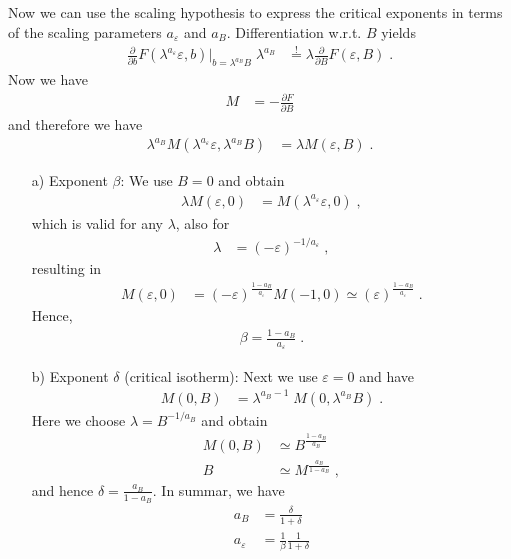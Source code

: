 Now we can use the scaling hypothesis to express the critical exponents
in terms of the scaling parameters $a_{\varepsilon}$ and $a_{B}$.
Differentiation w.r.t. $B$ yields
%
\begin{align*}
 \frac{\partial }{\partial b}
 F(\lambda^{a_{\varepsilon}}\varepsilon,b) \bigg|_{b= \lambda^{a_{B}}B}
\; \lambda^{a_{B}}
&\overset{!}{=} \lambda
\frac{\partial }{\partial B}
F(\varepsilon,B)\;.
\end{align*}
%
Now we have 
%
\begin{align*}
M &= -\frac{\partial F}{\partial B}
\end{align*}
%
and therefore  we have
%
\begin{align}
\lambda^{a_{B}} 
M(\lambda^{a_{\varepsilon}}\varepsilon,\lambda^{a_{B}}B) 
&= \lambda M(\varepsilon,B)\;.
\end{align}
%
\begin{enumerate}
	\item[a)] {\color{blue}Exponent $\beta$:} We use $B=0$ and obtain
%
\begin{align*}
\lambda M(\varepsilon,0) &=M(\lambda^{a_{\varepsilon}}\varepsilon,0) \;,
\end{align*}
%
which is valid for any $\lambda$, also for 
%
\begin{align*}
\lambda&=(-\varepsilon)^{-1/a_{\varepsilon}}\;,
\end{align*}
%
resulting in 
%
\begin{align*}
M(\varepsilon,0) &= (-\varepsilon)^{\frac{1-a_{B}}{a_{\varepsilon}}} M(-1,0)\simeq (\varepsilon)^{\frac{1-a_{B}}{a_{\varepsilon}}} \;.
\end{align*}
%
Hence, 
%
\begin{align*}
\beta=\frac{1-a_{B}}{a_{\varepsilon}} \;.
\end{align*}
%
\item[b)] {\color{blue}Exponent $\delta$ (critical isotherm):}
Next we use $\varepsilon=0$ and have
%
\begin{align*}
M(0,B) &= \lambda^{a_{B}-1}\;M(0,\lambda^{a_{B}}B)\;.
\end{align*}
%
Here we choose $\lambda =B^{-1/a_{B}}$ and obtain
%
\begin{align*}
M(0,B) &\simeq  B^{\frac{1-a_{B}}{a_{B}}}\\
B &\simeq M^{\frac{a_{B}}{1-a_{B}}}\;,
\end{align*}
%
and hence $\delta=\frac{a_{B}}{1-a_{B}}$.
In summar, we have
%
\begin{align}\label{eq:}
a_{B} &= \frac{\delta}{1+\delta}\\
a_{\varepsilon} &= \frac{1}{\beta}\frac{1}{1+\delta}\\
\end{align}
%
\end{enumerate}
